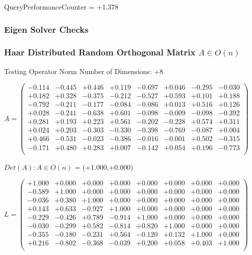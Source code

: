 \documentclass[9pt]{article}
\theoremstyle{plain}
\theoremstyle{definition}
\theoremstyle{remark}
\numberwithin{equation}{section}
\begin{document}
QueryPerformanceCounter  =  +1.378
\subsubsection{Eigen Solver Checks}
\subsubsection{Haar Distributed Random Orthogonal Matrix $A \in O(n)$}
 Testing Operator Norm
Number of Dimensions: +8

$A = \left(
\begin{array}{
cccccccc}
-0.114 & -0.445 & +0.446 & +0.119 & -0.697 & +0.046 & -0.295 & -0.030 \\
+0.182 & +0.328 & -0.375 & -0.212 & -0.527 & +0.593 & +0.101 & +0.188 \\
-0.792 & -0.211 & -0.177 & -0.084 & -0.086 & +0.013 & +0.516 & +0.126 \\
+0.028 & -0.241 & -0.638 & +0.601 & -0.098 & -0.009 & -0.098 & -0.392 \\
+0.281 & +0.193 & +0.223 & +0.561 & -0.202 & -0.228 & +0.574 & +0.311 \\
+0.024 & +0.203 & -0.303 & -0.330 & -0.398 & -0.769 & -0.087 & +0.004 \\
+0.466 & -0.531 & -0.023 & -0.386 & -0.016 & -0.001 & +0.502 & -0.315 \\
-0.171 & +0.480 & +0.283 & +0.007 & -0.142 & +0.054 & +0.196 & -0.773 \\
\end{array}
\right)$ \newline 

$Det(A) :   A \in O(n)$ = (+1.000,+0.000)

$L = \left(
\begin{array}{
cccccccc}
+1.000 & +0.000 & +0.000 & +0.000 & +0.000 & +0.000 & +0.000 & +0.000 \\
-0.589 & +1.000 & +0.000 & +0.000 & +0.000 & +0.000 & +0.000 & +0.000 \\
-0.036 & +0.380 & +1.000 & +0.000 & +0.000 & +0.000 & +0.000 & +0.000 \\
+0.143 & +0.633 & -0.927 & +1.000 & +0.000 & +0.000 & +0.000 & +0.000 \\
-0.229 & -0.426 & +0.789 & -0.914 & +1.000 & +0.000 & +0.000 & +0.000 \\
-0.030 & -0.299 & +0.582 & -0.814 & +0.820 & +1.000 & +0.000 & +0.000 \\
-0.355 & -0.180 & -0.231 & +0.564 & -0.120 & +0.132 & +1.000 & +0.000 \\
+0.216 & -0.802 & -0.368 & -0.039 & +0.200 & +0.058 & +0.403 & +1.000 \\
\end{array}
\right)$ \newline 
\end{document}
